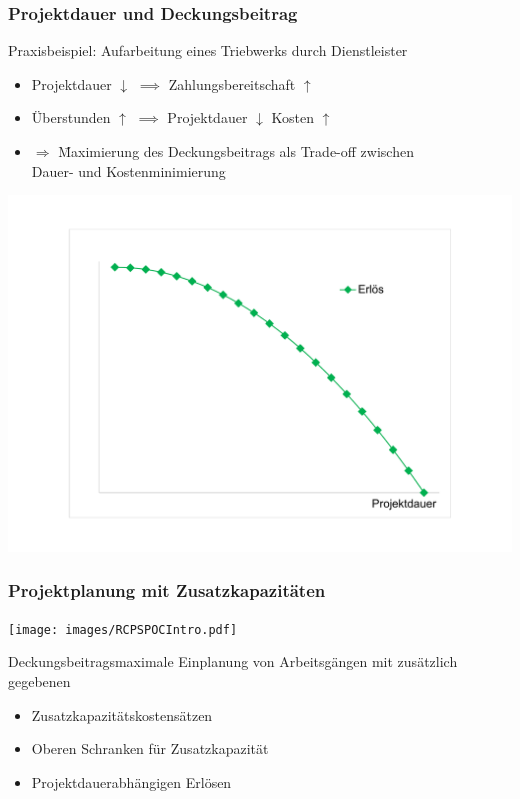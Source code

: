 \begin{frame}
\frametitle{Projektdauer und Deckungsbeitrag}
\begin{small}
Praxisbeispiel: Aufarbeitung eines Triebwerks durch Dienstleister
\begin{itemize}
\item Projektdauer {\large $\downarrow$} $\implies$ Zahlungsbereitschaft {\large $\uparrow$\\}
\item Überstunden {\large $\uparrow$} $\implies$ Projektdauer {\large $\downarrow$} Kosten {\large $\uparrow$}\\
\item[] \begin{tabbing}
$\Rightarrow$ \= Maximierung des Deckungsbeitrags als Trade-off zwischen\\
\>Dauer- und Kostenminimierung
\end{tabbing}

\end{itemize}
\end{small}
\begin{center}
\includegraphics[page=3,scale=0.29]{images/ErloesKostenDeckungsbeitrag.pdf}
\end{center}
\end{frame}


\begin{frame}[t]
	\frametitle{Projektplanung mit Zusatzkapazitäten}
	\begin{center}
		\texttt{[image: images/RCPSPOCIntro.pdf]}\\
	\end{center}
	
	{\small
		Deckungsbeitragsmaximale Einplanung von Arbeitsgängen mit zusätzlich gegebenen
		\begin{itemize}
			\itemsep0em
			\item Zusatzkapazitätskostensätzen
			\item Oberen Schranken für Zusatzkapazität
			\item Projektdauerabhängigen Erlösen
		\end{itemize}
	}
\end{frame}

